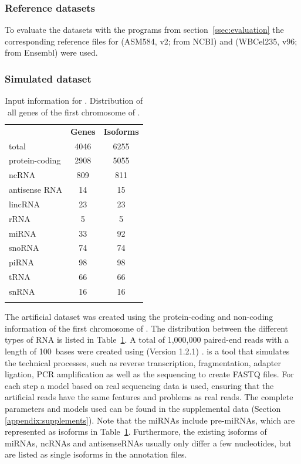 \documentclass[12pt,a4paper,english]{article}
\begin{document}
\subsubsection*{Reference datasets}
	To evaluate the datasets with the programs from section~\ref{ssec:evaluation} the corresponding reference files for \ecoli (ASM584, v2; from NCBI) and \celegans (WBCel235, v96; from Ensembl) were used.

\newpage
\subsubsection*{Simulated dataset}
	\label{ssec:simulation}
	\begin{table}
		\centering
		\caption[Input distribution for \flux.]{Input information for \flux. Distribution of all genes of the first chromosome of \celegans.}
		\label{table:input_flux}
		\begin{tabular}{lcc}
			\toprule
			 & \multicolumn{1}{r}{\textbf{Genes}} & \multicolumn{1}{r}{\textbf{Isoforms}} \\ \addlinespace
			\midrule
			total & 4046 & 6255 \\ \addlinespace
			protein-coding & 2908 & 5055 \\ \addlinespace
			ncRNA & 809 & 811 \\ \addlinespace
			antisense RNA & 14 & 15 \\ \addlinespace
			lincRNA & 23 & 23 \\ \addlinespace
			rRNA & 5 & 5 \\ \addlinespace
			miRNA & 33 & 92 \\ \addlinespace
			snoRNA & 74 & 74 \\ \addlinespace
			piRNA & 98 & 98 \\ \addlinespace
			tRNA & 66 & 66 \\ \addlinespace
			snRNA & 16 & 16 \\ \addlinespace
			\bottomrule
		\end{tabular}
	\end{table}
	The artificial dataset was created using the protein-coding and non-coding information of the first chromosome of \celegans. The distribution between the different types of RNA is listed in Table~\ref{table:input_flux}. A total of 1,000,000 paired-end reads with a length of 100~bases were created using \flux (Version 1.2.1) \citep{flux-simulator}. \flux is a tool that simulates the technical processes, such as reverse transcription, fragmentation, adapter ligation, PCR amplification as well as the sequencing to create FASTQ files. For each step a model based on real sequencing data is used, ensuring that the artificial reads have the same features and problems as real reads. The complete parameters and models used can be found in the supplemental data (Section \ref{appendix:supplements}). Note that the miRNAs include pre-miRNAs, which are represented as isoforms in Table~\ref{table:input_flux}. Furthermore, the existing isoforms of miRNAs, ncRNAs and antisenseRNAs usually only differ a few nucleotides, but are listed as single isoforms in the annotation files.
\end{document}
